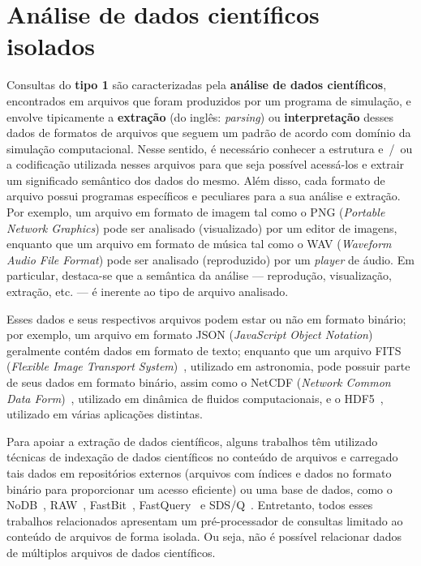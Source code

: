 \section{Análise de dados científicos isolados}%
\label{sec:analise-de-dados-cientificos-isolados}

Consultas do \textbf{tipo 1} são caracterizadas pela \textbf{análise de dados científicos}, encontrados em arquivos que foram produzidos por um programa de simulação, e envolve tipicamente a \textbf{extração} (do inglês: \textit{parsing}) ou \textbf{interpretação} desses dados de formatos de arquivos que seguem um padrão de acordo com domínio da simulação computacional. Nesse sentido, é necessário conhecer a estrutura e~/~ou a codificação utilizada nesses arquivos para que seja possível acessá-los e extrair um significado semântico dos dados do mesmo. Além disso, cada formato de arquivo possui programas específicos e peculiares para a sua análise e extração. Por exemplo, um arquivo em formato de imagem tal como o  PNG (\textit{Portable Network Graphics}) pode ser analisado (visualizado) por um editor de imagens, enquanto que um arquivo em formato de música tal como o  WAV (\textit{Waveform Audio File Format}) pode ser analisado (reproduzido) por um \textit{player} de áudio. Em particular, destaca-se que a semântica da análise --- reprodução, visualização, extração, etc. --- é inerente ao tipo de arquivo analisado.

Esses dados e seus respectivos arquivos podem estar ou não em formato binário; por exemplo, um arquivo em formato  JSON (\textit{JavaScript Object Notation}) geralmente contém dados em formato de texto; enquanto que um arquivo FITS (\textit{Flexible Image Transport System})~\cite{greisen2002representations}, utilizado em astronomia, pode possuir parte de seus dados em formato binário, assim como o NetCDF (\textit{Network Common Data Form})~\cite{rew1990netcdf}, utilizado em dinâmica de fluidos computacionais, e o HDF5~\cite{folk1999hdf5}, utilizado em várias aplicações distintas.

Para apoiar a extração de dados científicos, alguns trabalhos têm utilizado técnicas de indexação de dados científicos no conteúdo de arquivos e carregado tais dados em repositórios externos (arquivos com índices e dados no formato binário para proporcionar um acesso eficiente) ou uma base de dados, como o NoDB~\cite{alagiannis2012nodb}, RAW~\cite{karpathiotakis2014adaptive}, FastBit~\cite{wu2009fastbit}, FastQuery~\cite{chou2011parallel} e SDS/Q~\cite{blanas2014parallel}. Entretanto, todos esses trabalhos relacionados apresentam um pré-processador de consultas limitado ao conteúdo de arquivos de forma isolada. Ou seja, não é possível relacionar dados de múltiplos arquivos de dados científicos.

